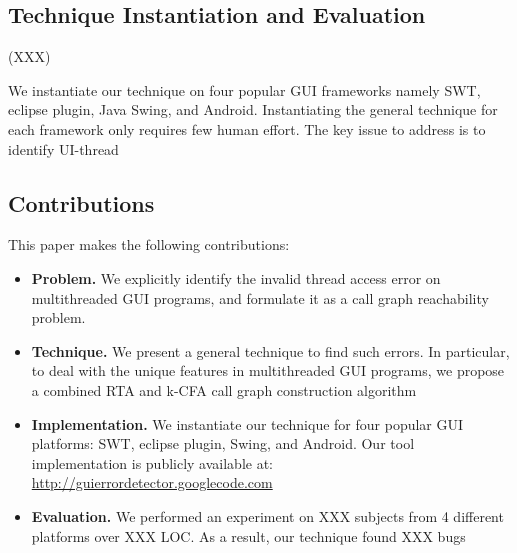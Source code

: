 \subsection{Technique Instantiation and Evaluation}

(XXX)

We instantiate our technique on four popular GUI frameworks namely SWT,
eclipse plugin, Java Swing, and Android. Instantiating the general technique
for each framework only requires few human effort. The key issue to address
is to identify UI-thread



\subsection{Contributions}

This paper makes the following contributions:

\begin{itemize}
\item \textbf{Problem.} We explicitly identify the invalid thread
access error on multithreaded GUI programs, and formulate it
as a call graph reachability problem.

\item \textbf{Technique.} We present a general technique to find
such errors. In particular, to deal with the unique features in
multithreaded GUI programs, we propose a combined RTA and k-CFA
call graph construction algorithm

\item \textbf{Implementation.} We instantiate our technique for four
popular GUI platforms: SWT, eclipse plugin, Swing, and Android. Our
tool implementation is publicly available at:
\url{http://guierrordetector.googlecode.com}

\item \textbf{Evaluation.} We performed an experiment on XXX subjects
from 4 different platforms over XXX LOC. As a result, our technique
found XXX bugs 

\end{itemize}

